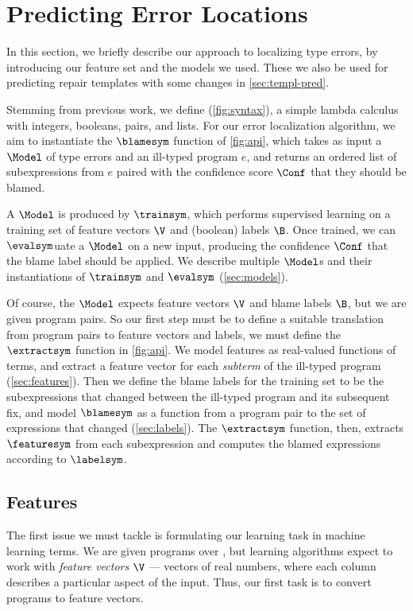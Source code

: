 
\section{Predicting Error Locations}
\label{sec:localization}

In this section, we briefly describe our approach to localizing type errors, by
introducing our feature set and the models we used. These we also be used for
predicting repair templates with some changes in \autoref{sec:templ-pred}.

Stemming from previous work, we define \lang (\autoref{fig:syntax}), a simple
lambda calculus with integers, booleans, pairs, and lists. For our error
localization algorithm, we aim to instantiate the $\blamesym$ function of
\autoref{fig:api}, which takes as input a $\Model$ of type errors and an
ill-typed program $e$, and returns an ordered list of subexpressions from $e$
paired with the confidence score $\Conf$ that they should be blamed.

A $\Model$ is produced by $\trainsym$, which performs supervised learning on a
training set of feature vectors $\V$ and (boolean) labels $\B$. Once trained, we
can $\evalsym$uate a $\Model$ on a new input, producing the confidence $\Conf$
that the blame label should be applied. We describe multiple $\Model$s and their
instantiations of $\trainsym$ and $\evalsym$ (\autoref{sec:models}).

Of course, the $\Model$ expects feature vectors $\V$ and blame labels $\B$, but
we are given program pairs. So our first step must be to define a suitable
translation from program pairs to feature vectors and labels, \ie we must define
the $\extractsym$ function in \autoref{fig:api}. We model features as
real-valued functions of terms, and extract a feature vector for each
\emph{subterm} of the ill-typed program (\autoref{sec:features}). Then we define
the blame labels for the training set to be the subexpressions that changed
between the ill-typed program and its subsequent fix, and model $\blamesym$ as a
function from a program pair to the set of expressions that changed
(\autoref{sec:labels}). The $\extractsym$ function, then, extracts $\featuresym$
from each subexpression and computes the blamed expressions according to
$\labelsym$.




\subsection{Features}
\label{sec:features}
The first issue we must tackle is formulating our learning task in machine
learning terms. We are given programs over \lang, but learning algorithms expect
to work with \emph{feature vectors} $\V$ --- vectors of real numbers, where each
column describes a particular aspect of the input. Thus, our first task is to
convert programs to feature vectors.

